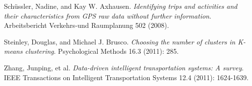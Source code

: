 \documentclass[twoside,leqno,twocolumn]{article}
\begin{document}
\begin{thebibliography}{99}
Schüssler, Nadine, and Kay W. Axhausen. {\em Identifying trips and activities and their characteristics from GPS raw data without further information}. Arbeitsbericht Verkehrs-und Raumplanung 502 (2008).

Steinley, Douglas, and Michael J. Brusco. {\em Choosing the number of clusters in Κ-means clustering}. Psychological Methods 16.3 (2011): 285.

Zhang, Junping, et al. {\em Data-driven intelligent transportation systems: A survey}. IEEE Transactions on Intelligent Transportation Systems 12.4 (2011): 1624-1639.


%

\end{thebibliography}
\end{document}
